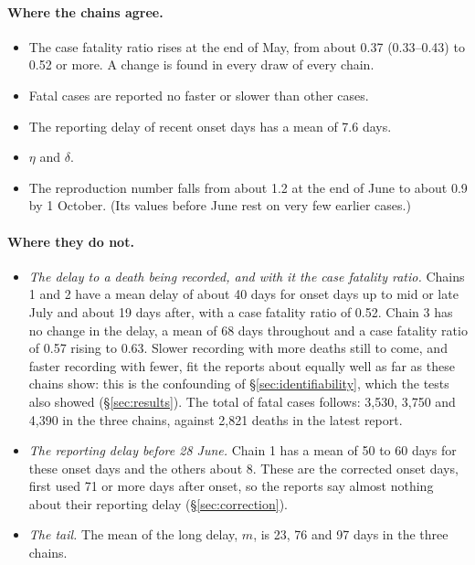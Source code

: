 \documentclass[11pt,a4paper]{article}
\begin{document}
\paragraph{Where the chains agree.}
\begin{itemize}
\item The case fatality ratio rises at the end of May, from about 0.37
(0.33--0.43) to 0.52 or more. A change is found in every draw of every
chain.
\item Fatal cases are reported no faster or slower than other cases.
\item The reporting delay of recent onset days has a mean of 7.6 days.
\item $\eta$ and $\delta$.
\item The reproduction number falls from about 1.2 at the end of June to
about 0.9 by 1 October. (Its values before June rest on very few earlier
cases.)
\end{itemize}

\paragraph{Where they do not.}
\begin{itemize}
\item \emph{The delay to a death being recorded, and with it the case
fatality ratio.} Chains 1 and 2 have a mean delay of about 40 days for
onset days up to mid or late July and about 19 days after, with a case
fatality ratio of 0.52. Chain 3 has no change in the delay, a mean of 68
days throughout and a case fatality ratio of 0.57 rising to 0.63. Slower
recording with more deaths still to come, and faster recording with fewer,
fit the reports about equally well as far as these chains show: this is the
confounding of \S\ref{sec:identifiability}, which the tests also showed
(\S\ref{sec:results}). The total of fatal cases follows: 3{,}530, 3{,}750
and 4{,}390 in the three chains, against 2{,}821 deaths in the latest
report.
\item \emph{The reporting delay before 28 June.} Chain 1 has a mean of 50
to 60 days for these onset days and the others about 8. These are the
corrected onset days, first used 71 or more days after onset, so the
reports say almost nothing about their reporting delay
(\S\ref{sec:correction}).
\item \emph{The tail.} The mean of the long delay, $m$, is 23, 76 and 97
days in the three chains.
\end{itemize}
\end{document}
